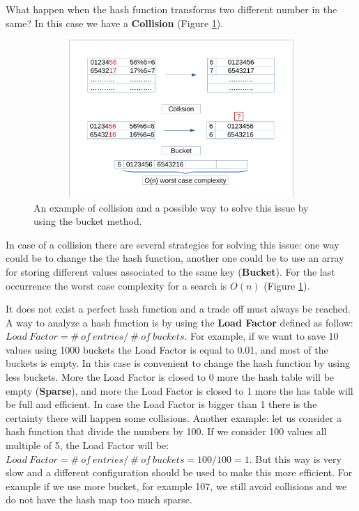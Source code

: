 What happen when the hash function transforms two different number in the same? In this case we have a \textbf{Collision} (Figure \ref{map_2}).
\begin{figure}[h]
	\includegraphics[width=14cm,height=6cm]{chapters/datastructures/images/map_2.pdf}
	\caption[]{An example of collision and a possible way to solve this issue by using the bucket method.}
	\label{map_2}
\end{figure}
In case of a collision there are several strategies for solving this issue: one way could be to change the the hash function, another one could be to use an array for storing different values associated to the same key (\textbf{Bucket}). For the last occurrence the worst case complexity for a search is \(O(n)\) (Figure \ref{map_2}).

It does not exist a perfect hash function and a trade off must always be reached. A way to analyze a hash function is by using the \textbf{Load Factor} defined as follow: \(Load \ Factor = \# \ of \ entries / \ \# \ of \ buckets\). For example, if we want to save 10 values using 1000 buckets the Load Factor is equal to 0.01, and most of the buckets is empty. In this case is convenient to change the hash function by using less buckets. More the Load Factor is closed to 0 more the hash table will be empty (\textbf{Sparse}), and more the Load Factor is closed to 1 more the has table will be full and efficient. In case the Load Factor is bigger than 1 there is the certainty there will happen some collisions.
Another example: let us consider a hash function that divide the numbers by 100. If we consider 100 values all multiple of 5, the Load Factor will be: \(Load \ Factor = \# \ of \ entries / \ \# \ of \ buckets = 100/100 = 1\). But this way is very slow and a different configuration should be used to make this more efficient. For example if we use more bucket, for example 107, we still avoid collisions and we do not have the hash map too much sparse.

